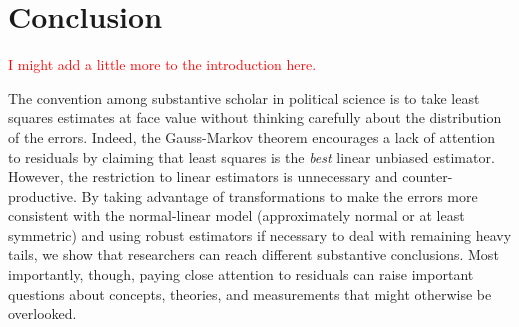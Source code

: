 \documentclass[12pt]{article}
\newcommand{\ctk}[1]{\textcolor{red}{#1}}
\begin{document}
\section*{Conclusion}

\ctk{I might add a little more to the introduction here.}

The convention among substantive scholar in political science is to take least squares estimates at face value without thinking carefully about the distribution of the errors. 
Indeed,  the Gauss-Markov theorem encourages a lack of attention to residuals by claiming that least squares is the \textit{best} linear unbiased estimator. 
However, the restriction to linear estimators is unnecessary and counter-productive. 
By taking advantage of transformations to make the errors more consistent with the normal-linear model (approximately normal or at least symmetric) and using robust estimators if necessary to deal with remaining heavy tails, we show that researchers can reach different substantive conclusions. 
Most importantly, though, paying close attention to residuals can raise important questions about concepts, theories, and measurements that might otherwise be overlooked. 

\singlespace

%

\end{document}
